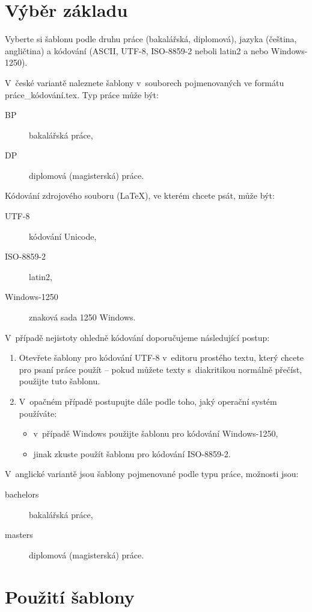 \documentclass[thesis=B,czech]{FITthesis}[2012/10/20]
\begin{document}
\section{Výběr základu}

Vyberte si šablonu podle druhu práce (bakalářská, diplomová), jazyka (čeština, angličtina) a kódování (ASCII, \mbox{UTF-8}, \mbox{ISO-8859-2} neboli latin2 a nebo \mbox{Windows-1250}). 

V~české variantě naleznete šablony v~souborech pojmenovaných ve formátu práce\_kódování.tex. Typ práce může být:
\begin{description}
	\item[BP] bakalářská práce,
	\item[DP] diplomová (magisterská) práce.
\end{description}
Kódování zdrojového souboru (\LaTeX{}), ve kterém chcete psát, může být:
\begin{description}
	\item[UTF-8] kódování Unicode,
	\item[ISO-8859-2] latin2,
	\item[Windows-1250] znaková sada 1250 Windows.
\end{description}
V~případě nejistoty ohledně kódování doporučujeme následující postup:
\begin{enumerate}
	\item Otevřete šablony pro kódování UTF-8 v~editoru prostého textu, který chcete pro psaní práce použít -- pokud můžete texty s~diakritikou normálně přečíst, použijte tuto šablonu.
	\item V~opačném případě postupujte dále podle toho, jaký operační systém používáte:
	\begin{itemize}
		\item v~případě Windows použijte šablonu pro kódování \mbox{Windows-1250},
		\item jinak zkuste použít šablonu pro kódování \mbox{ISO-8859-2}.
	\end{itemize}
\end{enumerate}


V~anglické variantě jsou šablony pojmenované podle typu práce, možnosti jsou:
\begin{description}
	\item[bachelors] bakalářská práce,
	\item[masters] diplomová (magisterská) práce.
\end{description}

\section{Použití šablony}
\end{document}
